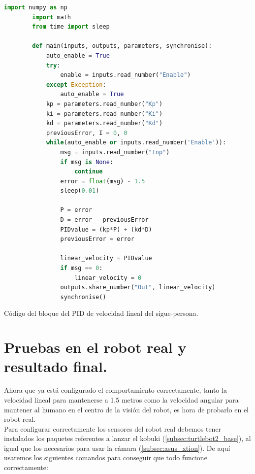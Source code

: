 \begin{code}[H]
    \begin{lstlisting}[language=python]
        import numpy as np
        import math
        from time import sleep
        
        def main(inputs, outputs, parameters, synchronise):
            auto_enable = True
            try:
                enable = inputs.read_number("Enable")
            except Exception:
                auto_enable = True
            kp = parameters.read_number("Kp")
            ki = parameters.read_number("Ki")
            kd = parameters.read_number("Kd")
            previousError, I = 0, 0
            while(auto_enable or inputs.read_number('Enable')):
                msg = inputs.read_number("Inp")
                if msg is None:
                    continue
                error = float(msg) - 1.5
                sleep(0.01)
        
                P = error
                D = error - previousError
                PIDvalue = (kp*P) + (kd*D)
                previousError = error
    
                linear_velocity = PIDvalue
                if msg == 0:
                    linear_velocity = 0
                outputs.share_number("Out", linear_velocity)
                synchronise()
    \end{lstlisting}
    \caption[Código bloque PID lineal sigue-persona]{Código del bloque del PID de velocidad lineal del sigue-persona.}
    \label{cod:PID_linear_FP}
\end{code}



\section{Pruebas en el robot real y resultado final.}
\label{sec:FP_final}

Ahora que ya está configurado el comportamiento correctamente, tanto la velocidad lineal para mantenerse a 1.5 metros como la velocidad angular para
mantener al humano en el centro de la visión del robot, es hora de probarlo en el robot real.\\

Para configurar correctamente los sensores del robot real debemos tener instalados los paquetes referentes a lanzar el kobuki (\ref{subsec:turtlebot2_base}),
al igual que los necesarios para usar la cámara (\ref{subsec:asus_xtion}).
De aquí usaremos los siguientes comandos para conseguir que todo funcione correctamente:

